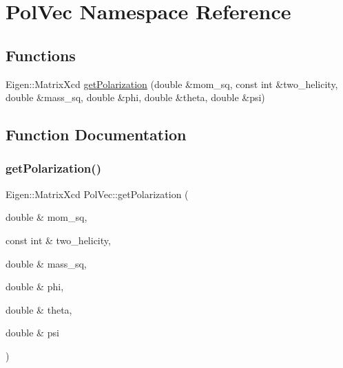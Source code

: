 \hypertarget{namespacePolVec}{}\section{Pol\+Vec Namespace Reference}
\label{namespacePolVec}
\subsection*{Functions}
\begin{DoxyCompactItemize}
\item 
Eigen\+::\+Matrix\+Xcd \mbox{\hyperlink{namespacePolVec_a068ffc885b3c06caa2c662b8887c0891}{get\+Polarization}} (double \&mom\+\_\+sq, const int \&two\+\_\+helicity, double \&mass\+\_\+sq, double \&phi, double \&theta, double \&psi)
\end{DoxyCompactItemize}


\subsection{Function Documentation}
\mbox{\label{namespacePolVec_a068ffc885b3c06caa2c662b8887c0891}} 
\subsubsection{\texorpdfstring{getPolarization()}{getPolarization()}}
{\footnotesize\ttfamily Eigen\+::\+Matrix\+Xcd Pol\+Vec\+::get\+Polarization (\begin{DoxyParamCaption}\item[{double \&}]{mom\+\_\+sq,  }\item[{const int \&}]{two\+\_\+helicity,  }\item[{double \&}]{mass\+\_\+sq,  }\item[{double \&}]{phi,  }\item[{double \&}]{theta,  }\item[{double \&}]{psi }\end{DoxyParamCaption})}

